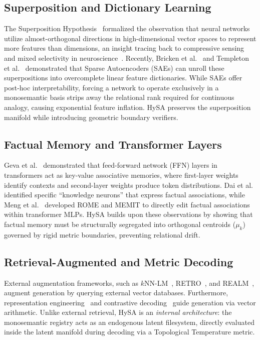 \documentclass[10pt,twocolumn]{article}
\theoremstyle{definition}
\begin{document}
\subsection{Superposition and Dictionary Learning}
The Superposition Hypothesis~\cite{elhage2022toy} formalized the observation that neural networks utilize almost-orthogonal directions in high-dimensional vector spaces to represent more features than dimensions, an insight tracing back to compressive sensing and mixed selectivity in neuroscience~\cite{rigotti2013importance, fusi2016why}. Recently, Bricken et al.~\cite{bricken2023monosemanticity} and Templeton et al.~\cite{templeton2024scaling} demonstrated that Sparse Autoencoders (SAEs) can unroll these superpositions into overcomplete linear feature dictionaries. While SAEs offer post-hoc interpretability, forcing a network to operate exclusively in a monosemantic basis strips away the relational rank required for continuous analogy, causing exponential feature inflation. HySA preserves the superposition manifold while introducing geometric boundary verifiers.

\subsection{Factual Memory and Transformer Layers}
Geva et al.~\cite{geva2021transformer} demonstrated that feed-forward network (FFN) layers in transformers act as key-value associative memories, where first-layer weights identify contexts and second-layer weights produce token distributions. Dai et al.~\cite{knowledge_neurons_2022} identified specific ``knowledge neurons'' that express factual associations, while Meng et al.~\cite{meng2022locating_rome, meng2022mass_memit} developed ROME and MEMIT to directly edit factual associations within transformer MLPs. HySA builds upon these observations by showing that factual memory must be structurally segregated into orthogonal centroids ($\mu_k$) governed by rigid metric boundaries, preventing relational drift.

\subsection{Retrieval-Augmented and Metric Decoding}
External augmentation frameworks, such as $k\text{NN}$-LM~\cite{khandelwal2020knn_lm}, RETRO~\cite{borgeaud2022retro}, and REALM~\cite{guu2020realm}, augment generation by querying external vector databases. Furthermore, representation engineering~\cite{zou2023representation} and contrastive decoding~\cite{li2023contrastive} guide generation via vector arithmetic. Unlike external retrieval, HySA is an \textit{internal architecture}: the monosemantic registry acts as an endogenous latent filesystem, directly evaluated inside the latent manifold during decoding via a Topological Temperature metric.
\end{document}
